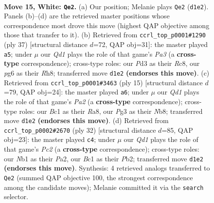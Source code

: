 \documentclass[11pt]{article}
\begin{document}
\clearpage

\begin{figure}[p]\centering
\begin{subfigure}{0.46\textwidth}\centering
\resizebox{\linewidth}{!}{%
\newchessgame
\chessboard[
  setfen={rn1q1rk1/4bp2/5np1/pp5p/3p4/1P1P1NP1/P4PKP/RNBQ1R2 w - - 0 15},
  showmover=false,
  pgfstyle=straightmove, color=movearrow, markmove={d1-e2}
]}
\caption{}
\end{subfigure}\hfill
\begin{subfigure}{0.46\textwidth}\centering
\resizebox{\linewidth}{!}{%
\newchessgame
\chessboard[
  setfen={2r4r/3nkp2/pqbpp1p1/1p5p/4P2P/P1PB1P2/1P1QN1P1/1K1R3R b - - 0 19},
  showmover=false,
  pgfstyle=straightmove, color=movearrow, markmove={a6-a5}
]}
\caption{}
\end{subfigure}
\\[4pt]
\begin{subfigure}{0.46\textwidth}\centering
\resizebox{\linewidth}{!}{%
\newchessgame
\chessboard[
  setfen={rnbq1rk1/p1p2ppp/3ppn2/1P6/3PP3/2N5/PP1Q1PPP/2KR1BNR b - - 0 8},
  showmover=false,
  pgfstyle=straightmove, color=movearrow, markmove={a7-a6}
]}
\caption{}
\end{subfigure}\hfill
\begin{subfigure}{0.46\textwidth}\centering
\resizebox{\linewidth}{!}{%
\newchessgame
\chessboard[
  setfen={2r1k2r/1pq1bpp1/p2ppn2/7p/3NP2P/4BP2/PPPQ2P1/1K1R1R2 w k - 0 17},
  showmover=false,
  pgfstyle=straightmove, color=movearrow, markmove={c2-c4}
]}
\caption{}
\end{subfigure}
\caption{\textbf{Move 15, White: \texttt{Qe2}.} (a) Our position; Melanie plays \texttt{Qe2} (\texttt{d1e2}). Panels (b)--(d) are the retrieved master positions whose correspondence most drove this move (highest QAP objective among those that transfer to it). (b) Retrieved from \texttt{ccrl\_top\_p0001\#1290} (ply 37) [structural distance $d$=72, QAP obj=31]: the master played \texttt{a5}; under $\mu$ our \emph{Qd1} plays the role of that game's \emph{Pa3} (a \textbf{cross-type} correspondence); cross-type roles: our \emph{P}d3 as their \emph{R}c8, our \emph{p}g6 as their \emph{R}h8; transferred move \texttt{d1e2} \textbf{(endorses this move)}. (c) Retrieved from \texttt{ccrl\_top\_p0001\#3463} (ply 15) [structural distance $d$=79, QAP obj=24]: the master played \texttt{a6}; under $\mu$ our \emph{Qd1} plays the role of that game's \emph{Pa2} (a \textbf{cross-type} correspondence); cross-type roles: our \emph{B}c1 as their \emph{R}a8, our \emph{P}g3 as their \emph{N}b8; transferred move \texttt{d1e2} \textbf{(endorses this move)}. (d) Retrieved from \texttt{ccrl\_top\_p0002\#2670} (ply 32) [structural distance $d$=85, QAP obj=23]: the master played \texttt{c4}; under $\mu$ our \emph{Qd1} plays the role of that game's \emph{Pc2} (a \textbf{cross-type} correspondence); cross-type roles: our \emph{N}b1 as their \emph{P}a2, our \emph{B}c1 as their \emph{P}b2; transferred move \texttt{d1e2} \textbf{(endorses this move)}. Synthesis: 4 retrieved analogs transferred to \texttt{Qe2} (summed QAP objective 100, the strongest correspondence among the candidate moves); Melanie committed it via the \texttt{search} selector.}
\label{fig:thought-m28}
\end{figure}
\end{document}
